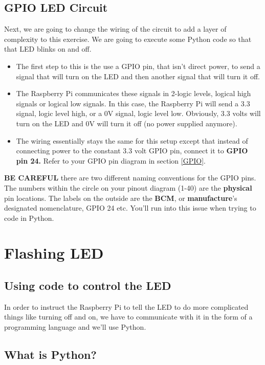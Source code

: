 \documentclass{article}\usepackage[]{graphicx}\usepackage[]{color}
\begin{document}
\subsection{GPIO LED Circuit}
Next, we are going to change the wiring of the circuit to add a layer of complexity to this exercise. We are going to execute some Python code so that that LED blinks on and off.
\begin{itemize}
\item The first step to this is the use a GPIO pin, that isn't direct power, to send a signal that will turn on the LED and then another signal that will turn it off.
\item The Raspberry Pi communicates these signals in 2-logic levels, logical high signals or logical low signals. In this case, the Raspberry Pi will send a 3.3 signal, logic level high, or a 0V signal, logic level low. Obviously, 3.3 volts will turn on the LED and 0V will turn it off (no power supplied anymore).
\item The wiring essentially stays the same for this setup except that instead of connecting power to the constant 3.3 volt GPIO pin, connect it to \textbf{GPIO pin 24.} Refer to your GPIO pin diagram in section \ref{GPIO}.
\end{itemize}
\textbf{BE CAREFUL} there are two different naming conventions for the GPIO pins. The numbers within the circle on your pinout diagram (1-40) are the \textbf{physical} pin locations. The labels on the outside are the \textbf{BCM}, or \textbf{manufacture}'s designated nomenclature, GPIO 24 etc. You'll run into this issue when trying to code in Python. \label{GPIO24}

\section{Flashing LED}

\subsection{Using code to control the LED}

In order to instruct the Raspberry Pi to tell the LED to do more complicated things like turning off and on, we have to communicate with it in the form of a programming language and we'll use Python.

\subsection{What is Python?}
\end{document}
